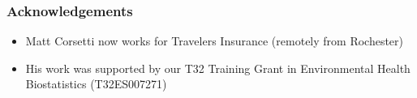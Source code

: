 \documentclass{beamer}
\begin{document}
%
%
%
%    
%
%
%
%
%
%    
%
%
%
%
%
%    
%
%
%

\begin{frame}

    \frametitle{Acknowledgements}
    
   
    \begin{itemize}
\item Matt Corsetti now works for Travelers Insurance (remotely from Rochester)
        \item His work was supported by our T32 Training Grant in Environmental Health Biostatistics (T32ES007271)
    \end{itemize}

\end{frame}
\end{document}
